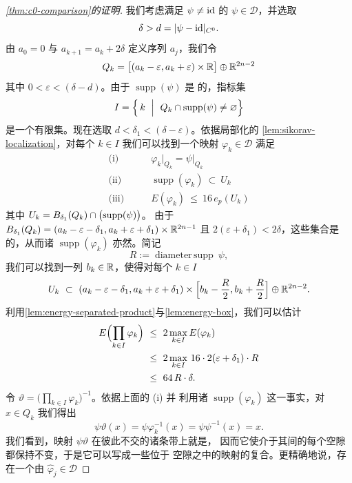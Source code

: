 \begin{proof}[\cref*{thm:c0-comparison}的证明]
我们考虑满足 $\psi\neq\mathrm{id}$ 的 $\psi\in\mathcal{D}$，并选取
\[
\delta>d=\lvert\psi-\mathrm{id}\rvert_{C^{0}}.
\]
由 $a_{0}=0$ 与 $a_{k+1}=a_{k}+2\delta$ 定义序列 $a_{j}$，我们令
\[
Q_{k}=\bigl[(a_{k}-\varepsilon,a_{k}+\varepsilon)\times\mathbb{R}\bigr]\oplus\mathbb{R}^{2n-2}
\]
其中 $0<\varepsilon<(\delta-d)$。由于 $\operatorname{supp}(\psi)$ 是%
\trCompact{}的，指标集
\[
I=\Bigl\{\,k\ \Bigm|\ Q_{k}\cap\operatorname{supp}(\psi)\neq\varnothing\Bigr\}
\]
是一个有限集。现在选取 $d<\delta_{1}<(\delta-\varepsilon)$。依据局部化的%
\cref{lem:sikorav-localization}，对每个 $k\in I$ 我们可以找到一个映射%
$\varphi_{k}\in\mathcal{D}$ 满足
\begin{align*}
\text{(i)}\qquad& \varphi_{k}\big|_{Q_{k}}=\psi\big|_{Q_{k}}\\
\text{(ii)}\qquad& \operatorname{supp}(\varphi_{k})\ \subset\ U_{k}\\
\text{(iii)}\qquad& E(\varphi_{k})\ \leq\ 16\,e_{p}(U_{k})
\end{align*}
其中 $U_{k}=B_{\delta_{1}}(Q_{k})\cap\text{\trConvexHull}\bigl(\operatorname{supp}(\psi)\bigr)$。%
由于 $B_{\delta_{1}}(Q_{k})=(a_{k}-\varepsilon-\delta_{1},a_{k}+\varepsilon+\delta_{1})\times\mathbb{R}^{2n-1}$%
且 $2(\varepsilon+\delta_{1})<2\delta$，这些集合是\trProperlySeparated{}的，从而诸%
$\operatorname{supp}(\varphi_{k})$ 亦然。简记
\[
R:=\operatorname{diameter\,supp}\ \psi,
\]
我们可以找到一列 $b_{k}\in\mathbb{R}$，使得对每个 $k\in I$
\[
U_{k}\ \subset\ (a_{k}-\varepsilon-\delta_{1},a_{k}+\varepsilon+\delta_{1})\times\Bigl[b_{k}-\frac{R}{2},b_{k}+\frac{R}{2}\Bigr]\oplus\R^{2n-2}.
\]
利用\cref{lem:energy-separated-product}与\cref{lem:energy-box}，我们可以估计
\begin{align}
E\Bigl(\prod_{k\in I}\varphi_{k}\Bigr)\ &\leq\ 2\max_{k\in I}E(\varphi_{k})\notag\\
&\leq\ 2\max_{k\in I}\,16\cdot2(\varepsilon+\delta_{1})\cdot R\notag\\
&\leq\ 64\,R\cdot\delta.\label{eq:product-energy-bound}
\end{align}
令 $\vartheta=\bigl(\prod_{k\in I}\varphi_{k}\bigr)^{-1}$。依据上面的 (i) 并%
利用诸 $\operatorname{supp}(\varphi_{k})$ \trProperlySeparated{}这一事实，对 $x\in Q_{k}$%
我们得出
\[
\psi\vartheta(x)=\psi\varphi_{k}^{-1}(x)=\psi\psi^{-1}(x)=x.
\]
我们看到，映射 $\psi\vartheta$ 在彼此不交的诸条带上就是\trIdentityMap，%
因而它使介于其间的每个空隙都保持不变，于是它可以写成一些\trSupport{}位于%
空隙之中的映射的复合。更精确地说，存在一个由 $\hat{\varphi}_{j}\in\mathcal{D}$%

\end{proof}
